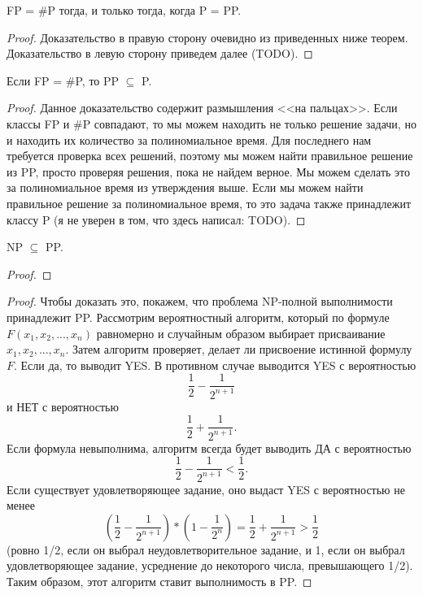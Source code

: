     \begin{Thm}
         FP = \#P тогда, и только тогда, когда P = PP.
    \end{Thm}
    \begin{proof}
        Доказательство в правую сторону очевидно из приведенных ниже теорем.\\
        Доказательство в левую сторону приведем далее (TODO).
    \end{proof}
    \begin{Thm}
        Если FP = \#P, то PP $\subseteq$ P.
    \end{Thm}
    \begin{proof}
        Данное доказательство содержит размышления <<на пальцах>>. Если классы FP и \#P совпадают, то мы можем находить не только решение задачи, но и находить их количество за полиномиальное время. Для последнего нам требуется проверка всех решений, поэтому мы можем найти правильное решение из PP, просто проверяя решения, пока не найдем верное. Мы можем сделать это за полиномиальное время из утверждения выше. Если мы можем найти правильное решение за полиномиальное время, то это задача также принадлежит классу P (я не уверен в том, что здесь написал: TODO).
    \end{proof}
    \begin{Thm}
        NP $\subseteq$ PP.
    \end{Thm}
    \begin{proof}
        
    \end{proof}
    \begin{proof}
        Чтобы доказать это, покажем, что проблема NP-полной выполнимости принадлежит PP. Рассмотрим вероятностный алгоритм, который по формуле $F(x_1, x_2, ..., x_n)$ равномерно и случайным образом выбирает присваивание $x_1, x_2, ..., x_n$. Затем алгоритм проверяет, делает ли присвоение истинной формулу $F$. Если да, то выводит YES. В противном случае выводится YES с вероятностью $$\frac{1}{2} - \frac{1}{2^{n+1}}$$ и НЕТ с вероятностью $$\frac{1}{2} + \frac{1}{2^{n+1}}.$$
        Если формула невыполнима, алгоритм всегда будет выводить ДА с вероятностью $$\frac{1}{2} - \frac{1}{2^{n+1}} < \frac{1}{2}.$$ Если существует удовлетворяющее задание, оно выдаст YES с вероятностью не менее $$(\frac{1}{2} - \frac{1}{2^{n+1}}) * (1 - \frac{1}{2^n}) = \frac{1}{2} + \frac{1}{2^{n+1}} > \frac{1}{2}$$ (ровно 1/2, если он выбрал неудовлетворительное задание, и 1, если он выбрал удовлетворяющее задание, усреднение до некоторого числа, превышающего 1/2). Таким образом, этот алгоритм ставит выполнимость в PP. 
    \end{proof}


